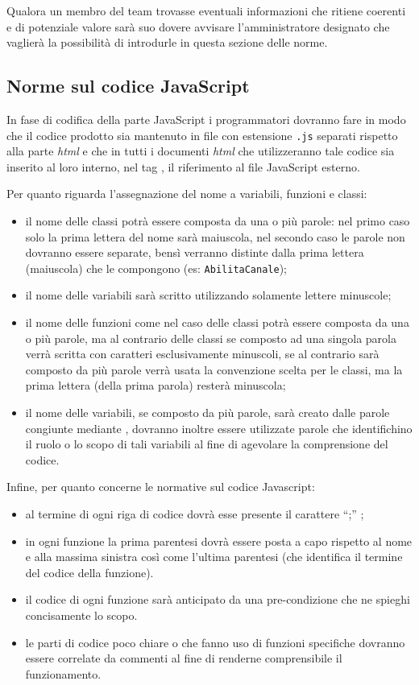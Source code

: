 {Qualora un membro del team trovasse eventuali informazioni che ritiene coerenti e di potenziale valore sarà suo dovere avvisare l'amministratore designato che vaglierà la possibilità di introdurle in questa sezione delle norme.

\subsection{Norme sul codice JavaScript}
In fase di codifica della parte JavaScript i programmatori dovranno fare in modo che il codice prodotto sia mantenuto in file con estensione \texttt{.js} separati rispetto alla parte \textit{html} e che in tutti i documenti \textit{html} che utilizzeranno tale codice sia inserito al loro interno, nel tag , il riferimento al file JavaScript esterno.

Per quanto riguarda l'assegnazione del nome a variabili, funzioni e classi:
\begin{itemize}
\item il nome delle classi potrà essere composta da una o più parole: nel primo caso solo la prima lettera del nome sarà maiuscola, nel secondo caso le parole non dovranno essere separate, bensì verranno distinte dalla prima lettera (maiuscola) che le compongono (es: \texttt{AbilitaCanale});
\item il nome delle variabili sarà scritto utilizzando solamente lettere minuscole;
\item il nome delle funzioni come nel caso delle classi potrà essere composta da una o più parole, ma al contrario delle classi se composto ad una singola parola verrà scritta con caratteri esclusivamente minuscoli, se al contrario sarà composto da più parole verrà usata la convenzione scelta per le classi, ma la prima lettera (della prima parola) resterà minuscola;
\item il nome delle variabili, se composto da più parole, sarà creato dalle parole congiunte mediante , dovranno inoltre essere utilizzate parole che identifichino il ruolo o lo scopo di tali variabili al fine di agevolare la comprensione del codice.
\end{itemize}

Infine, per quanto concerne le normative sul codice Javascript:
\begin{itemize}
\item al termine di ogni riga di codice dovrà esse presente il carattere ``;'' ;
\item in ogni funzione la prima parentesi dovrà essere posta a capo rispetto al nome e alla massima sinistra così come l'ultima parentesi (che identifica il termine del codice della funzione). 
\item il codice di ogni funzione sarà anticipato da una pre-condizione che ne spieghi concisamente lo scopo.
\item le parti di codice poco chiare o che fanno uso di funzioni specifiche dovranno essere correlate da commenti al fine di renderne comprensibile il funzionamento.
\end{itemize}

}
